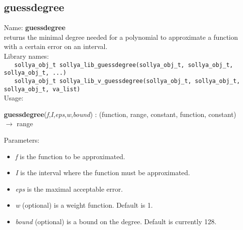 \subsection{guessdegree}
\label{labguessdegree}
\noindent Name: \textbf{guessdegree}\\
\phantom{aaa}returns the minimal degree needed for a polynomial to approximate a function with a certain error on an interval.\\[0.2cm]
\noindent Library names:\\
\verb|   sollya_obj_t sollya_lib_guessdegree(sollya_obj_t, sollya_obj_t, sollya_obj_t, ...)|\\
\verb|   sollya_obj_t sollya_lib_v_guessdegree(sollya_obj_t, sollya_obj_t, sollya_obj_t, va_list)|\\[0.2cm]
\noindent Usage: 
\begin{center}
\textbf{guessdegree}(\emph{f},\emph{I},\emph{eps},\emph{w},\emph{bound}) : (\textsf{function}, \textsf{range}, \textsf{constant}, \textsf{function}, \textsf{constant}) $\rightarrow$ \textsf{range}\\
\end{center}
Parameters: 
\begin{itemize}
\item \emph{f} is the function to be approximated.
\item \emph{I} is the interval where the function must be approximated.
\item \emph{eps} is the maximal acceptable error.
\item \emph{w} (optional) is a weight function. Default is 1.
\item \emph{bound} (optional) is a bound on the degree. Default is currently 128.
\end{itemize}
